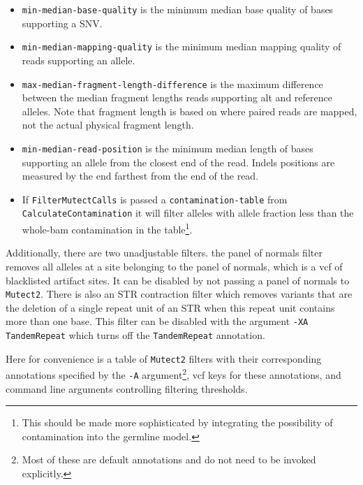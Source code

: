 \documentclass[nofootinbib,amssymb,amsmath]{revtex4}
\newcommand{\code}[1]{\texttt{#1}}
\begin{document}
\begin{itemize}
\item \code{min-median-base-quality} is the minimum median base quality of bases supporting a SNV.
\item \code{min-median-mapping-quality} is the minimum median mapping quality of reads supporting an allele.
\item \code{max-median-fragment-length-difference} is the maximum difference between the median fragment lengths reads supporting alt and reference alleles.  Note that fragment length is based on where paired reads are mapped, not the actual physical fragment length.
\item \code{min-median-read-position} is the minimum median length of bases supporting an allele from the closest end of the read.  Indels positions are measured by the end farthest from the end of the read.
\item If \code{FilterMutectCalls} is passed a \code{contamination-table} from \code{CalculateContamination} it will filter alleles with allele fraction less than the whole-bam contamination in the table\footnote{This should be made more sophisticated by integrating the possibility of contamination into the germline model.}.
\end{itemize}

Additionally, there are two unadjustable filters. the panel of normals filter removes all alleles at a site belonging to the panel of normals, which is a vcf of blacklisted artifact sites.  It can be disabled by not passing a panel of normals to \code{Mutect2}.  There is also an STR contraction filter which removes variants that are the deletion of a single repeat unit of an STR when this repeat unit contains more than one base.  This filter can be disabled with the argument \code{-XA TandemRepeat} which turns off the \code{TandemRepeat} annotation.

Here for convenience is a table of \code{Mutect2} filters with their corresponding annotations specified by the \code{-A} argument\footnote{Most of these are default annotations and do not need to be invoked explicitly.}, vcf keys for these annotations, and command line arguments controlling filtering thresholds.
\end{document}
